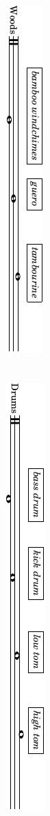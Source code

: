 \documentclass[10pt]{article}
\begin{document}
\begin{textblock}{23}
\begin{itemize}
        \includegraphics{preface-percussion-woods.pdf} \\ \\ \\
        \includegraphics{preface-percussion-drums.pdf} \\


\end{itemize}
\end{textblock}
\end{document}
